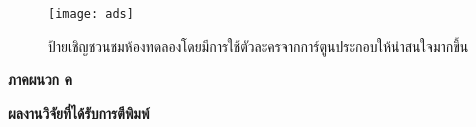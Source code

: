 \begin{figure}
    \centering
    \texttt{[image: ads]}
    \caption{ป้ายเชิญชวนชมห้องทดลองโดยมีการใช้ตัวละครจากการ์ตูนประกอบให้น่าสนใจมากขึ้น}
    \label{Fig:ads}
\end{figure}

\clearpage 
\thispagestyle{empty}
\begin{center}
	\LARGE{\textbf{ภาคผนวก ค}}
\end{center}

\clearpage 
\thispagestyle{empty}
\begin{center}
    \LARGE{\textbf{ผลงานวิจัยที่ได้รับการตีพิมพ์}}
\end{center}

